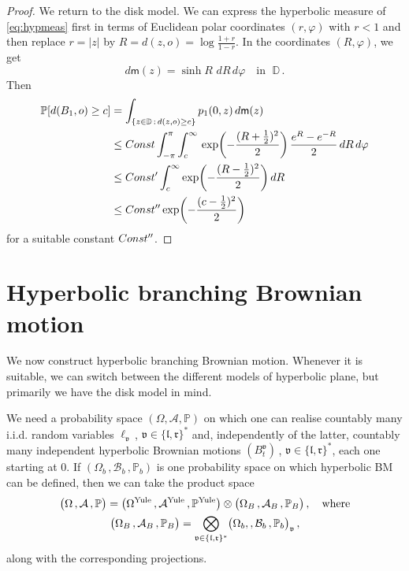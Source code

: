 \documentclass[12pt]{amsart}
\newcommand\A{\mathcal A}
\newcommand\BB{\textit{\textbf{B}}}
\newcommand\Bor{\mathcal B}
\newcommand\DD{\mathbb D}
\newcommand\lt{\mathfrak{l}}
\newcommand\mm{\mathsf m}
\newcommand\Prob{\mathbb P}
\newcommand\ro{d}
\newcommand\rt{\mathfrak{r}}
\newcommand\vt{\mathfrak{v}}
\numberwithin{theorem}{section}
\theoremstyle{definition}
\begin{document}
\begin{proof}
We return to the disk model.
We can express the hyperbolic measure of \eqref{eq:hypmeas} first in terms of
Euclidean polar coordinates $(r, \varphi)$ with $r <1$ and then replace 
$r = |z|$ by $R =  \ro(z,o) = \log \frac{1+r}{1-r}$. In the coordinates 
$(R,\varphi)$, we get
\begin{equation}\label{eq:hypmeas1}
d\mm(z) = \sinh R\,\, dR\, d\varphi \quad \text{in }\;\DD\,.
\end{equation}
Then
$$
\begin{aligned}
 \Prob[ \ro(B_1,o) \ge c] &= \int_{\{z \in \DD \,:\, \ro(z,o) \ge c\}} p_1(0,z)\,d\mm(z)\\
 &\le \textsl{Const} \int_{-\pi}^{\pi} \int_{c}^{\infty}
\,  \exp\biggl(-\frac{(R+\tfrac{1}{2})^2}{2}\biggr) 
\, \frac{e^R - e^{-R}}{2}\,
dR\, d\varphi\\
&\le \textsl{Const}' \int_{c}^{\infty}
\exp\biggl(-\frac{(R-\tfrac{1}{2})^2}{2}\biggr) \, 
dR\\
&\le \textsl{Const}'' 
\exp\biggl(-\frac{(c-\tfrac{1}{2})^2}{2}\biggr) 
\end{aligned}
$$
for a suitable constant $\textsl{Const}''$. 
\end{proof}


\section{Hyperbolic branching Brownian motion}\label{sec:hypBBM}

We now construct hyperbolic branching Brownian motion. Whenever it is suitable,
we can switch between the different models of hyperbolic plane, but primarily
we have the disk model in mind.

We need a probability space $(\Omega, \A, \Prob)$ on which one can realise 
countably many  i.i.d. random variables $\ell_{\vt}\,$, $\vt \in \{\lt,\rt\}^*$ and,
independently of the latter, countably many independent hyperbolic Brownian motions 
$(B_t^{\vt})\,$, $\vt \in \{\lt,\rt\}^*$, each one starting at $0$.
If $(\Omega_b\,, \Bor_b\,, \Prob_b)$ is one probability space on which hyperbolic 
BM can be defined, then we can take the product space  
$$
\begin{gathered}
\bigl(\Omega\,, \A\,,\Prob\bigr) =
\bigl(\Omega^{\text{Yule}}\,, \A^{\text{Yule}}\,,\Prob^{\text{Yule}}\bigr)\otimes \bigl(\Omega_{\BB}\,, \A_{\BB}\,,\Prob_\BB\bigr)\,,
\quad\text{where}\\
\bigl(\Omega_{\BB}\,, \A_{\BB}\,,\Prob_{\BB}\bigr) = \bigotimes_{\vt \in \{\lt,\rt\}^*}
\bigl(\Omega_b,, \Bor_b\,,\Prob_b\bigr)_{\vt}\,,
\end{gathered}
$$ 
along with the corresponding projections.
\end{document}
